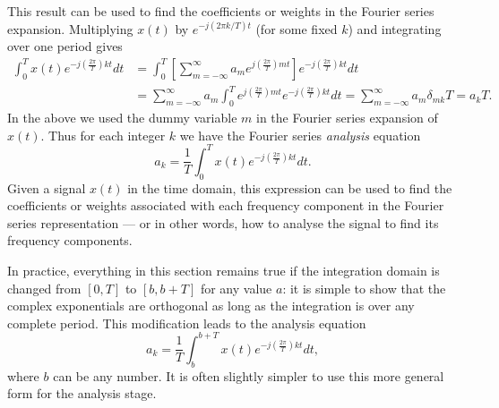 \documentclass[10pt]{beamer}
\begin{document}
This result can be used to find the coefficients or weights in the Fourier series expansion.  Multiplying $x(t)$ by $e^{-j (2\pi k/T) t}$ (for some fixed $k$) and integrating over one period gives
\begin{align*}
  \int_0^T x(t) e^{-j \left( \frac{2 \pi}{T} \right) k t} dt 
  &= \int_0^T \left[ \sum_{m=-\infty}^\infty a_m e^{j \left( \frac{2 \pi}{T} \right) m t} \right] e^{-j \left( \frac{2 \pi}{T} \right) k t} dt \\ 
  &= \sum_{m=-\infty}^\infty a_m \int_0^T e^{j \left( \frac{2 \pi}{T} \right) m t} e^{-j \left( \frac{2 \pi}{T} \right) k t} dt 
  = \sum_{m=-\infty}^\infty a_m \delta_{mk} T = a_k T.
\end{align*}
In the above we used the dummy variable $m$ in the Fourier series expansion of $x(t)$.  Thus for each integer $k$ we have the Fourier series {\em analysis} equation
\begin{equation*}
  a_k = \frac{1}{T} \int_0^T x(t) e^{-j \left( \frac{2 \pi}{T} \right) k t} dt.
\end{equation*}
Given a signal $x(t)$ in the time domain, this expression can be used to find the coefficients or weights associated with each frequency component in the Fourier series representation --- or in other words, how to analyse the signal to find its frequency components.

In practice, everything in this section remains true if the integration domain is changed from $[0,T]$ to $[b,b+T]$ for any value $a$:  it is simple to show that the complex exponentials are orthogonal as long as the integration is over any complete period.  This modification leads to the analysis equation
\begin{equation*}
  a_k = \frac{1}{T} \int_{b}^{b+T} x(t) e^{-j \left( \frac{2 \pi}{T} \right) k t} dt,
\end{equation*}
where $b$ can be any number.  It is often slightly simpler to use this more general form for the analysis stage.
\end{document}
